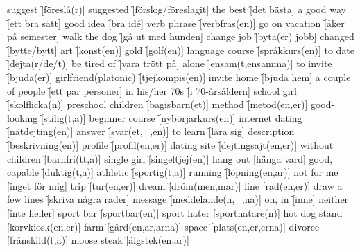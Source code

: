 \begin{questions}
    \begin{multicols}{2}
        \raggedcolumns
        \question suggest \f[föreslå(r)]
        \question suggested \f[förslog/föreslagit]
        \question the best \f[det bästa]
        \question a good way \f[ett bra sätt]
        \question good idea \f[bra id\'e]
        \question verb phrase \f[verbfras(en)]
        \question go on vacation \f[åker på semester]
        \question walk the dog \f[gå ut med hunden]
        \question change job \f[byta(er) jobb]
        \question changed \f[bytte/bytt]
        \question art \f[konst(en)]
        \question gold \f[golf(en)]
        \question language course \f[språkkurs(en)]
        \question to date \f[dejta(r/de/t)]
        \question be tired of \f[vara trött på]
        \question alone \f[ensam(t,ensamma)]
        \question to invite \f[bjuda(er)]
        \question girlfriend(platonic) \f[tjejkompis(en)]
        \question invite home \f[bjuda hem]
        \question a couple of people \f[ett par personer]
        \question in his/her 70s \f[i 70-årsåldern]
        \question school girl \f[skolflicka(n)]
        \question preschool children \f[bagisbarn(et)]
        \question method \f[metod(en,er)]
        \question good-looking \f[stilig(t,a)]
        \question beginner course \f[nybörjarkurs(en)]
        \question internet dating \f[nätdejting(en)]
        \question answer \f[svar(et,\_,en)]
        \question to learn \f[lära sig]
        \question description \f[beskrivning(en)]
        \question profile \f[profil(en,er)]
        \question dating site \f[dejtingsajt(en,er)]
        \question without children \f[barnfri(tt,a)]
        \question single girl \f[singeltjej(en)]
        \question hang out \f[hänga vard]
        \question good, capable \f[duktig(t,a)]
        \question athletic \f[sportig(t,a)]
        \question running \f[löpning(en,ar)]
        \question not for me \f[inget för mig]
        \question trip \f[tur(en,er)]
        \question dream \f[dröm(men,mar)]
        \question line \f[rad(en,er)]
        \question draw a few lines \f[skriva några rader]
        \question message \f[meddelande(n,\_,na)]
        \question on, in \f[inne]
        \question neither \f[inte heller]
        \question sport bar \f[sportbar(en)]
        \question sport hater \f[sporthatare(n)]
        \question hot dog stand \f[korvkiosk(en,er)]
        \question farm \f[gård(en,ar,arna)]
        \question space \f[plats(en,er,erna)]
        \question divorce \f[frånskild(t,a)]
        \question moose steak \f[älgstek(en,ar)]

\end{multicols}
\end{questions}
